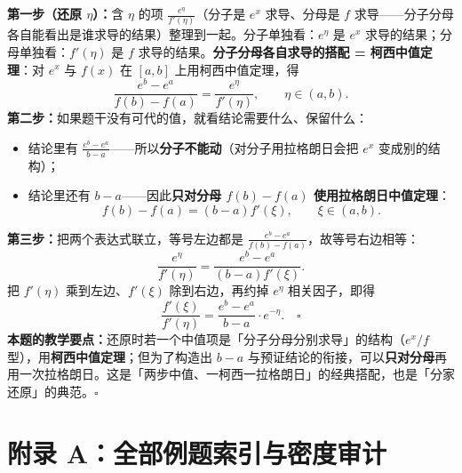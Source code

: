 \documentclass[a4paper]{article}
\begin{document}
\textbf{第一步（还原 $\eta$）：}含 $\eta$ 的项 $\frac{e^{\eta}}{f'(\eta)}$（分子是 $e^x$ 求导、分母是 $f$ 求导——分子分母各自能看出是谁求导的结果）整理到一起。分子单独看：$e^{\eta}$ 是 $e^x$ 求导的结果；分母单独看：$f'(\eta)$ 是 $f$ 求导的结果。\textbf{分子分母各自求导的搭配 = 柯西中值定理}：对 $e^x$ 与 $f(x)$ 在 $[a,b]$ 上用柯西中值定理，得
\[
\frac{e^{b}-e^{a}}{f(b)-f(a)}=\frac{e^{\eta}}{f'(\eta)},\qquad \eta\in(a,b).
\]
\textbf{第二步：}如果题干没有可代的值，就看结论需要什么、保留什么：
\begin{itemize}
\item 结论里有 $\frac{e^{b}-e^{a}}{b-a}$——所以\textbf{分子不能动}（对分子用拉格朗日会把 $e^x$ 变成别的结构）；
\item 结论里还有 $b-a$——因此\textbf{只对分母 $f(b)-f(a)$ 使用拉格朗日中值定理}：
\[
f(b)-f(a)=(b-a)f'(\xi),\qquad \xi\in(a,b).
\]
\end{itemize}
\textbf{第三步：}把两个表达式联立，等号左边都是 $\frac{e^{b}-e^{a}}{f(b)-f(a)}$，故等号右边相等：
\[
\frac{e^{\eta}}{f'(\eta)}=\frac{e^{b}-e^{a}}{(b-a)f'(\xi)}.
\]
把 $f'(\eta)$ 乘到左边、$f'(\xi)$ 除到右边，再约掉 $e^\eta$ 相关因子，即得
\[
\frac{f'(\xi)}{f'(\eta)}=\frac{e^{b}-e^{a}}{b-a}\cdot e^{-\eta}.\quad\square
\]
\textbf{本题的教学要点：}还原时若一个中值项是「分子分母分别求导」的结构（$e^x/f$ 型），用\textbf{柯西中值定理}；但为了构造出 $b-a$ 与预证结论的衔接，可以\textbf{只对分母}再用一次拉格朗日。这是「两步中值、一柯西一拉格朗日」的经典搭配，也是「分家还原」的典范。$\square$

\section{附录 A：全部例题索引与密度审计}
\end{document}
